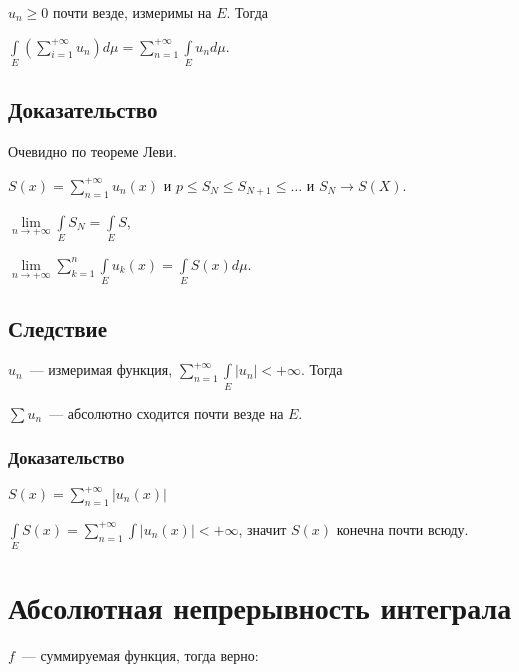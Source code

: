 \documentclass{article}
\begin{document}
        $u_n \geqslant 0$ почти везде, измеримы на $E$. Тогда
        
        $\int\limits_{E} \left( \sum\limits^{+\infty}_{i = 1} u_n \right) d \mu = \sum\limits^{+\infty}_{n = 1} \int\limits_{E} u_n d \mu$.
        
        \subsection{Доказательство}
        
            Очевидно по теореме Леви.
            
            $S(x) = \sum\limits^{+\infty}_{n = 1} u_n(x)$ и $p \leqslant S_N \leqslant S_{N + 1} \leqslant \ldots$ и $S_N \rightarrow S(X)$.
            
            $\lim\limits_{n \rightarrow +\infty} \int\limits_{E} S_N = \int\limits_{E} S$,
            
            $\lim\limits_{n \rightarrow +\infty} \sum\limits^n_{k = 1} \int\limits_{E} u_k(x) = \int\limits_{E} S(x) d \mu$.
            
        \subsection{Следствие}
        
            $u_n$~--- измеримая функция, $\sum\limits^{+\infty}_{n = 1} \int\limits_{E} | u_n | < +\infty$. Тогда
            
            $\sum u_n$~--- абсолютно сходится почти везде на $E$.
            
            \subsubsection{Доказательство}
            
                $S(x) = \sum\limits^{+\infty}_{n = 1} | u_n(x) |$
                
                $\int\limits_{E} S(x) = \sum\limits^{+\infty}_{n = 1} \int\limits | u_n(x) | < +\infty$, значит $S(x)$ конечна почти всюду.
    
    \newpage
    
    \section{Абсолютная непрерывность интеграла}
    
        $f$~--- суммируемая функция, тогда верно:
        
\end{document}
